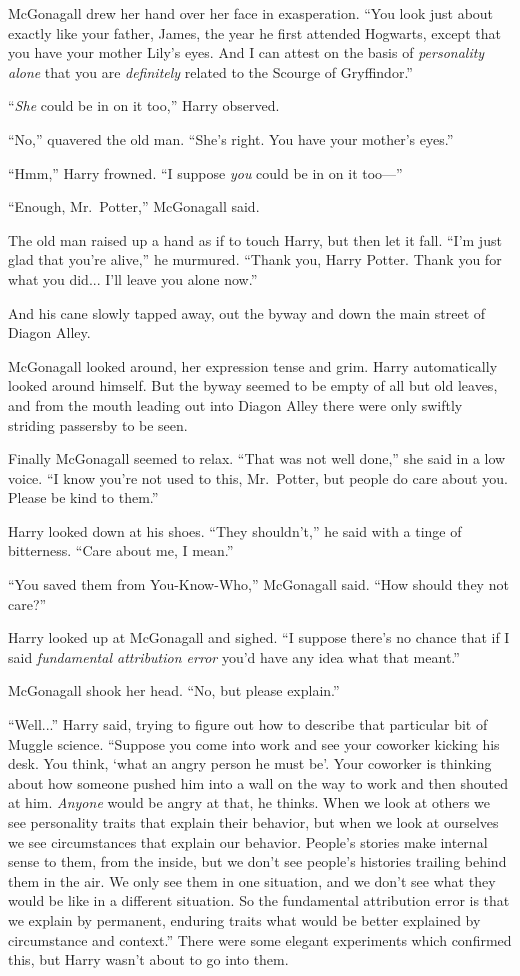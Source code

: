 McGonagall drew her hand over her face in exasperation. “You look just about exactly like your father, James, the year he first attended Hogwarts, except that you have your mother Lily’s eyes. And I can attest on the basis of \emph{personality alone} that you are \emph{definitely} related to the Scourge of Gryffindor.”

“\emph{She} could be in on it too,” Harry observed.

“No,” quavered the old man. “She’s right. You have your mother’s eyes.”

“Hmm,” Harry frowned. “I suppose \emph{you} could be in on it too—”

“Enough, Mr.~Potter,” McGonagall said.

The old man raised up a hand as if to touch Harry, but then let it fall. “I’m just glad that you’re alive,” he murmured. “Thank you, Harry Potter. Thank you for what you did... I’ll leave you alone now.”

And his cane slowly tapped away, out the byway and down the main street of Diagon Alley.

McGonagall looked around, her expression tense and grim. Harry automatically looked around himself. But the byway seemed to be empty of all but old leaves, and from the mouth leading out into Diagon Alley there were only swiftly striding passersby to be seen.

Finally McGonagall seemed to relax. “That was not well done,” she said in a low voice. “I know you’re not used to this, Mr.~Potter, but people do care about you. Please be kind to them.”

Harry looked down at his shoes. “They shouldn’t,” he said with a tinge of bitterness. “Care about me, I mean.”

“You saved them from You-Know-Who,” McGonagall said. “How should they not care?”

Harry looked up at McGonagall and sighed. “I suppose there’s no chance that if I said \emph{fundamental attribution error} you’d have any idea what that meant.”

McGonagall shook her head. “No, but please explain.”

“Well...” Harry said, trying to figure out how to describe that particular bit of Muggle science. “Suppose you come into work and see your coworker kicking his desk. You think, ‘what an angry person he must be’. Your coworker is thinking about how someone pushed him into a wall on the way to work and then shouted at him. \emph{Anyone} would be angry at that, he thinks. When we look at others we see personality traits that explain their behavior, but when we look at ourselves we see circumstances that explain our behavior. People’s stories make internal sense to them, from the inside, but we don’t see people’s histories trailing behind them in the air. We only see them in one situation, and we don’t see what they would be like in a different situation. So the fundamental attribution error is that we explain by permanent, enduring traits what would be better explained by circumstance and context.” There were some elegant experiments which confirmed this, but Harry wasn’t about to go into them.

